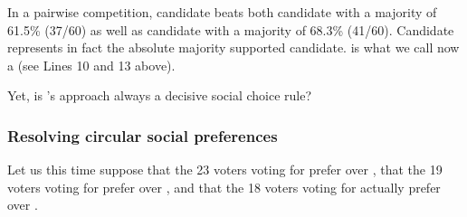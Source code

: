 \documentclass[a4paper,12pt,english]{sphinxhowto}
\begin{document}
\sphinxAtStartPar
In a pairwise competition, candidate  beats both candidate  with a majority of 61.5\% (37/60) as well as candidate  with a majority of 68.3\% (41/60). Candidate  represents in fact the absolute majority supported candidate.  is what we call now a  (see Lines 10 and 13 above).

\sphinxAtStartPar
Yet, is ’s approach always a decisive social choice rule?


\subsubsection{Resolving circular social preferences}
\label{\detokenize{pearls:resolving-circular-social-preferences}}
\sphinxAtStartPar
Let us this time suppose that the 23 voters voting for  prefer  over , that the 19 voters voting for  prefer  over , and that the 18 voters voting for  actually prefer  over .
\end{document}
